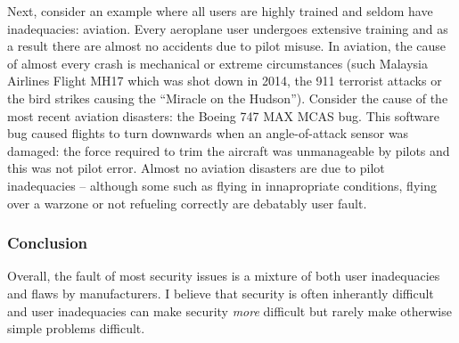 \documentclass[10pt,\jkfside,a4paper]{article}
\begin{document}
\begin{enumerate}
Next, consider an example where all users are highly trained and seldom have inadequacies: aviation. 
Every aeroplane user undergoes extensive training and as a result there are almost no accidents due to 
pilot misuse. In aviation, the cause of almost every crash is mechanical or extreme circumstances 
(such Malaysia Airlines Flight MH17 which was shot down in 2014, the 911 terrorist attacks or the 
bird strikes causing the ``Miracle on the Hudson''). Consider the cause of the most recent aviation 
disasters: the Boeing 747 MAX MCAS bug. This software bug caused flights to turn downwards when an 
angle-of-attack sensor was damaged: the force required to trim the aircraft was unmanageable by pilots 
and this was not pilot error. Almost no aviation disasters are due to pilot inadequacies -- although 
some such as flying in innapropriate conditions, flying over a warzone or not refueling correctly 
are debatably user fault.

\subsubsection*{Conclusion}

Overall, the fault of most security issues is a mixture of both user inadequacies and flaws by 
manufacturers. I believe that security is often inherantly difficult and user inadequacies 
can make security \textit{more} difficult but rarely make otherwise simple problems difficult.

\end{enumerate}
\end{document}
